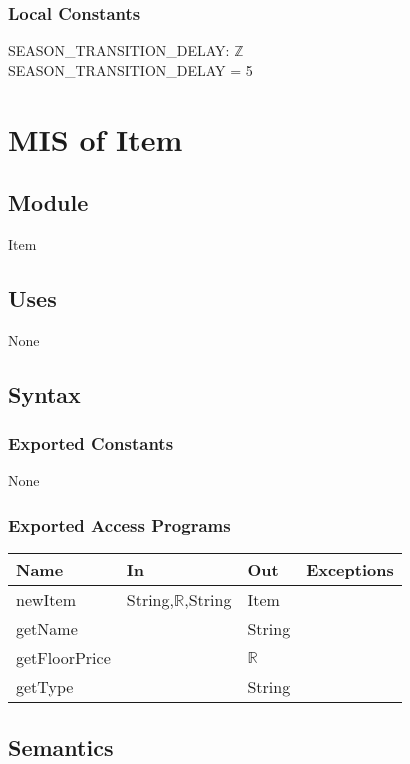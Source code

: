 \documentclass[12pt, titlepage]{article}
\begin{document}
\subsubsection{Local Constants}
SEASON\_TRANSITION\_DELAY: $\mathbb{Z}$\\
SEASON\_TRANSITION\_DELAY = 5



\newpage

\section{MIS of Item} 


\subsection{Module}
Item

\subsection{Uses}
None


\subsection{Syntax}

\subsubsection{Exported Constants}
None

\subsubsection{Exported Access Programs}

\begin{center}
\begin{tabular}{p{2cm} p{4cm} p{4cm} p{2cm}}
\hline
\textbf{Name} & \textbf{In} & \textbf{Out} & \textbf{Exceptions} \\
\hline
newItem & String,$\mathbb{R}$,String & Item & \\
\hline
getName &  & String & \\
\hline
getFloorPrice &  & $\mathbb{R}$ & \\
\hline
getType &  & String & \\
\hline 
\end{tabular}
\end{center}

\subsection{Semantics}
\end{document}
